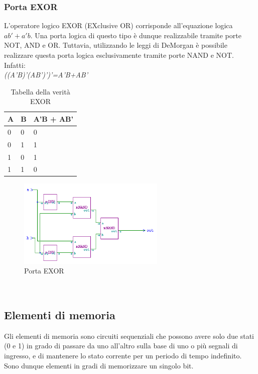\documentclass[10pt]{article}
\begin{document}
\begin{itemize}
\subsubsection{Porta EXOR}
L'operatore logico EXOR (EXclusive OR) corrisponde all'equazione logica $ab' + a'b$. Una porta logica di questo tipo è dunque realizzabile tramite porte NOT, AND e OR.
Tuttavia, utilizzando le leggi di DeMorgan è possibile realizzare questa porta logica esclusivamente tramite porte NAND e NOT. Infatti:
\\
\emph{((A'B)'(AB')')'=A'B+AB'}
\\
\begin{table}[H]
    \begin{minipage}[b]{\textwidth}
    \centering
    \begin{tabular}{|ll|l|}
        \hline
        \textbf{A} & \textbf{B} & \textbf{A'B + AB'} \\ \hline
        0          & 0          & 0                  \\ \hline
        0          & 1          & 1                  \\ 
        1          & 0          & 1                  \\
        1          & 1          & 0                  \\ \hline
        \end{tabular}
        \caption{Tabella della verità EXOR}
        \label{table:student}
    \end{minipage}
    \end{table}
    
    \begin{figure}[H]
    \begin{minipage}[b]{\textwidth}
    
    \includegraphics[width=70mm]{exor}
    \caption{Porta EXOR}
    \label{ }
    \end{minipage}
    \end{figure}
\\
\subsection{Elementi di memoria}
Gli elementi di memoria sono circuiti sequenziali che possono avere solo due stati (0 e 1) in grado di passare da uno all'altro sulla base di uno o più segnali di ingresso, e di mantenere lo stato
corrente per un periodo di tempo indefinito. Sono dunque elementi in gradi di memorizzare un singolo bit.


\end{itemize}
\end{document}
